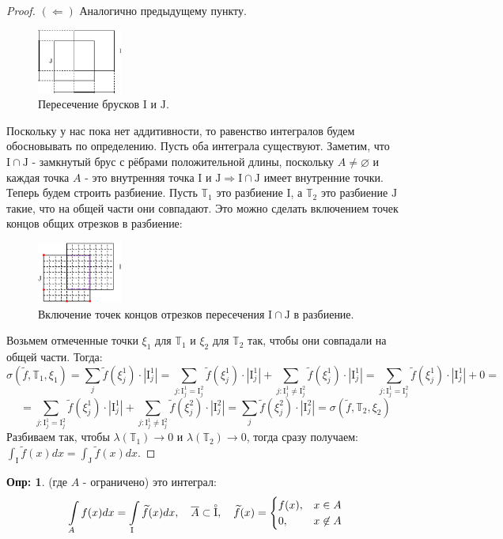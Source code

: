 \documentclass[12pt]{article}
\newcommand{\MTB}{\mathbb{T}}
\newcommand{\MI}{\mathrm{I}}
\newcommand{\MJ}{\mathrm{J}}
\newcommand{\VN}{\varnothing}
\theoremstyle{definition}
\newtheorem{defn}{Опр:}
\newcommand{\ddsum}[2]{\displaystyle\sum\limits_{#1}^{#2}}
\newcommand{\ddint}[2]{\displaystyle\int\limits_{#1}^{#2}}
\newcommand{\wte}[1]{\widetilde{#1}}
\newcommand{\ovl}[1]{\overline{#1}}
\newcommand{\Circ}[1]{\accentset{\circ}{#1}}
\begin{document}
\begin{proof}
	$(\Leftarrow)$ Аналогично предыдущему пункту.
	\begin{figure}[H]
		\centering
		\includegraphics[width=0.25\textwidth]{MA4L4_2.eps}
		\caption{Пересечение брусков $\MI$ и $\MJ$.}
		\label{4_2}
	\end{figure}
	Поскольку у нас пока нет аддитивности, то равенство интегралов будем обосновывать по определению. Пусть оба интеграла существуют. Заметим, что $\MI \cap \MJ$ - замкнутый брус с рёбрами положительной длины, поскольку $A \neq \VN$ и каждая точка $A$ - это внутренняя точка $\MI$ и $\MJ \Rightarrow \MI \cap \MJ$ имеет внутренние точки. Теперь будем строить разбиение. Пусть $\MTB_1$ это разбиение $\MI$, а $\MTB_2$ это разбиение $\MJ$ такие, что на общей части они совпадают. Это можно сделать включением точек концов общих отрезков в разбиение:
	\begin{figure}[H]
		\centering
		\includegraphics[width=0.25\textwidth]{MA4L4_3.eps}
		\caption{Включение точек концов отрезков пересечения $\MI \cap \MJ$ в разбиение.}
		\label{4_3}
	\end{figure}
	Возьмем отмеченные точки $\xi_1$ для $\MTB_1$ и $\xi_2$ для $\MTB_2$ так, чтобы они совпадали на общей части. Тогда:
	$$
		\sigma(\wte{f},\MTB_1,\xi_1) = \ddsum{j}{}\wte{f}(\xi_j^1){\cdot}|\MI_j^1| = \ddsum{j \colon \MI_j^1 = \MI_j^2}{}\wte{f}(\xi_j^1){\cdot}|\MI_j^1| + \ddsum{j \colon \MI_j^1 \neq \MI_j^2}{}\wte{f}(\xi_j^1){\cdot}|\MI_j^1| = \ddsum{j \colon \MI_j^1 = \MI_j^2}{}\wte{f}(\xi_j^1){\cdot}|\MI_j^1| + 0 =
	$$
	$$
		=	\ddsum{j \colon \MI_j^1 = \MI_j^2}{}\wte{f}(\xi_j^1){\cdot}|\MI_j^1| + \ddsum{j \colon \MI_j^1 \neq \MI_j^2}{}\wte{f}(\xi_j^2){\cdot}|\MI_j^2| = \ddsum{j}{}\wte{f}(\xi_j^2){\cdot}|\MI_j^2| = \sigma(\wte{f},\MTB_2,\xi_2)
	$$
	Разбиваем так, чтобы $\lambda(\MTB_1) \to 0$ и $\lambda(\MTB_2) \to 0$, тогда сразу получаем: $\int_\MI\wte{f}(x)dx = \int_\MJ\wte{f}(x)dx$.
\end{proof}

\begin{defn}
	 (где $A$ - ограничено) это интеграл: 
	$$
		\ddint{A}{} f(x)dx = \ddint{\MI}{} \wte{f}(x)dx, \quad \ovl{A}\subset \Circ{\MI}, \quad
		\wte{f}(x) = 
		\begin{cases}
			f(x), & x \in A \\
			0, & x \not\in A
		\end{cases}
	$$
\end{defn}
\end{document}
